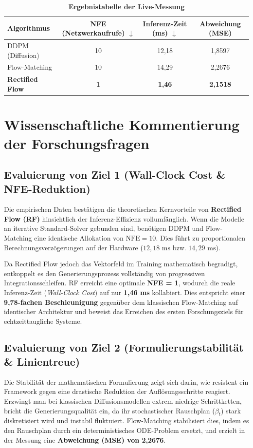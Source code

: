 \documentclass[11pt,a4paper]{article}
\begin{document}
\begin{table}[h]
\centering
\caption{\textbf{Ergebnistabelle der Live-Messung}}
\vspace{0.2cm}
\begin{tabular}{lccc}
\toprule
\textbf{Algorithmus} & \textbf{NFE (Netzwerkaufrufe) $\downarrow$} & \textbf{Inferenz-Zeit (ms) $\downarrow$} & \textbf{Abweichung (MSE)} \\
\midrule
DDPM (Diffusion) & 10 & 12,18 & 1,8597 \\
Flow-Matching    & 10 & 14,29 & 2,2676 \\
\textbf{Rectified Flow} & \textbf{1} & \textbf{1,46} & \textbf{2,1518} \\
\bottomrule
\end{tabular}
\end{table}

\section{Wissenschaftliche Kommentierung der Forschungsfragen}

\subsection{Evaluierung von Ziel 1 (Wall-Clock Cost \& NFE-Reduktion)}
Die empirischen Daten bestätigen die theoretischen Kernvorteile von \textbf{Rectified Flow (RF)} hinsichtlich der Inferenz-Effizienz vollumfänglich. Wenn die Modelle an iterative Standard-Solver gebunden sind, benötigen DDPM und Flow-Matching eine identische Allokation von $\text{NFE} = 10$. Dies führt zu proportionalen Berechnungsverzögerungen auf der Hardware ($12,18\text{ ms}$ bzw. $14,29\text{ ms}$). 

Da Rectified Flow jedoch das Vektorfeld im Training mathematisch begradigt, entkoppelt es den Generierungsprozess vollständig von progressiven Integrationsschleifen. RF erreicht eine optimale \textbf{NFE = 1}, wodurch die reale Inferenz-Zeit (\textit{Wall-Clock Cost}) auf nur \textbf{1,46 ms} kollabiert. Dies entspricht einer \textbf{9,78-fachen Beschleunigung} gegenüber dem klassischen Flow-Matching auf identischer Architektur und beweist das Erreichen des ersten Forschungsziels für echtzeittaugliche Systeme.

\subsection{Evaluierung von Ziel 2 (Formulierungstabilität \& Linientreue)}
Die Stabilität der mathematischen Formulierung zeigt sich darin, wie resistent ein Framework gegen eine drastische Reduktion der Auflösungsschritte reagiert. Erzwingt man bei klassischen Diffusionsmodellen extrem niedrige Schrittketten, bricht die Generierungsqualität ein, da ihr stochastischer Rauschplan ($\beta_t$) stark diskretisiert wird und instabil fluktuiert. Flow-Matching stabilisiert dies, indem es den Rauschplan durch ein deterministisches ODE-Problem ersetzt, und erzielt in der Messung eine \textbf{Abweichung (MSE) von 2,2676}.
\end{document}
